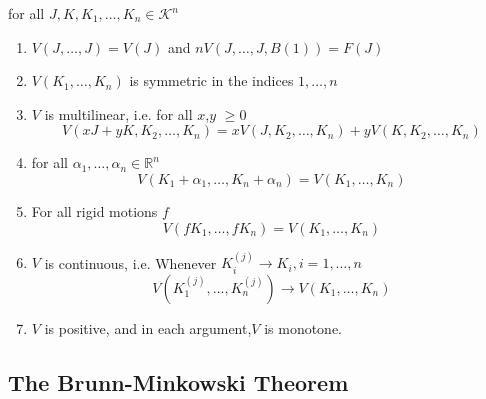 \documentclass[oneside]{book}
\begin{document}
 for all $J, K, K_{1}, \ldots, K_{n} 
  \in \mathcal{K}^{n}$ \\ 
  \begin{enumerate}
      
  \item
$V(J, \ldots, J)=V(J)$ and $ nV(J, \ldots, J, B(1))=F(J)$ 
\item 
$V\left(K_{1}, \ldots, K_{n}\right)$ is symmetric in the indices $1,\ldots, n$
\item
 $V$ is multilinear, i.e.
 for all $ x$,$y$ $\geq 0 $
$$
V\left(x J+y K, K_{2}, \ldots, K_{n}\right)=x V\left(J, K_{2}, \ldots, K_{n}\right)+y V\left(K, K_{2}, \ldots, K_{n}\right)
$$
\item
for all $\alpha_{1}, \ldots, \alpha_{n} \in \mathbb{R}^{n}$
$$
V\left(K_{1}+\alpha_{1}, \ldots, K_{n}+\alpha_{n}\right)=V\left(K_{1}, \ldots, K_{n}\right)
$$
\item  
For all rigid motions $f$ 
$$ 
V\left(f K_{1}, \ldots, f K_{n}\right)=V\left(K_{1}, \ldots, K_{n}\right)
$$ 
\item
$V$ is continuous, i.e.
Whenever $K_{i}^{(j)} \rightarrow K_{i}, i=1, \ldots, n$
\[
V\left(K_{1}^{(j)}, \ldots, K_{n}^{(j)}\right) \rightarrow V\left(K_{1}, \ldots, K_{n}\right)
\]
\item $V$ is positive, and in each argument,$V$ is monotone.	 
 
  \end{enumerate}
 
 
 
 
 \subsection{The Brunn-Minkowski Theorem}
 
\end{document}
